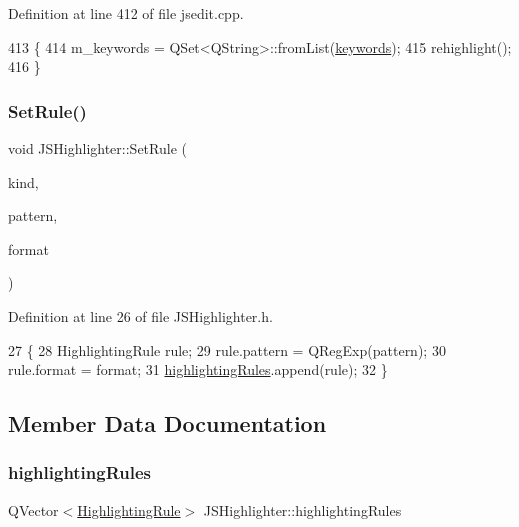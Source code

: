 Definition at line 412 of file jsedit.\+cpp.


\begin{DoxyCode}
413 \{
414     m\_keywords = QSet<QString>::fromList(\hyperlink{class_j_s_highlighter_af01421450f2260f630488f63a8912445}{keywords});
415     rehighlight();
416 \}
\end{DoxyCode}
\mbox{\label{class_j_s_highlighter_aab4501a701fd36da2510f3bd26422e7a}} 
\subsubsection{\texorpdfstring{Set\+Rule()}{SetRule()}}
{\footnotesize\ttfamily void J\+S\+Highlighter\+::\+Set\+Rule (\begin{DoxyParamCaption}\item[{Q\+String}]{kind,  }\item[{Q\+String}]{pattern,  }\item[{Q\+Text\+Char\+Format}]{format }\end{DoxyParamCaption})\hspace{0.3cm}{\ttfamily [inline]}}



Definition at line 26 of file J\+S\+Highlighter.\+h.


\begin{DoxyCode}
27     \{
28         HighlightingRule rule;
29         rule.pattern = QRegExp(pattern);
30         rule.format = format;
31         \hyperlink{class_j_s_highlighter_a42499ae459e9a65266f1a08e7cd7d214}{highlightingRules}.append(rule);
32     \}
\end{DoxyCode}


\subsection{Member Data Documentation}
\mbox{\label{class_j_s_highlighter_a42499ae459e9a65266f1a08e7cd7d214}} 
\subsubsection{\texorpdfstring{highlighting\+Rules}{highlightingRules}}
{\footnotesize\ttfamily Q\+Vector$<$\hyperlink{struct_j_s_highlighter_1_1_highlighting_rule}{Highlighting\+Rule}$>$ J\+S\+Highlighter\+::highlighting\+Rules}




